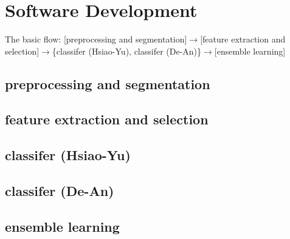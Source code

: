 \section{Software Development}

The basic flow: [preprocessing and segmentation]$\rightarrow$[feature extraction and selection]$\rightarrow$\{classifer (Hsiao-Yu), classifer (De-An)\}$\rightarrow$[ensemble learning]

\subsection{preprocessing and segmentation}



\subsection{feature extraction and selection}



\subsection{classifer (Hsiao-Yu)}


\subsection{classifer (De-An)}


\subsection{ensemble learning}



